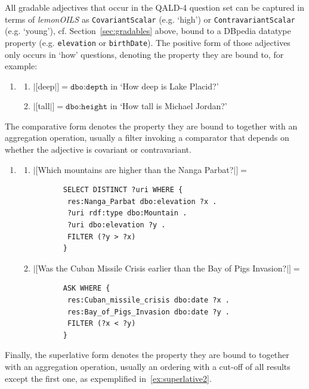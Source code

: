 \documentclass[11pt]{article}
\begin{document}
All gradable adjectives that occur in the QALD-4 question set can be captured in terms of \emph{lemonOILS} 
as \texttt{CovariantScalar} (e.g. `high') or \texttt{ContravariantScalar} (e.g. `young'), cf. Section~\ref{sec:gradables} above, 
bound to a DBpedia datatype property (e.g. \texttt{elevation} or \texttt{birthDate}). 
The positive form of those adjectives only occurs in `how' questions, denoting the property they are bound to, for example:
\begin{enumerate}[resume] 
\item \begin{enumerate}
 \item $|[$deep$|]=\texttt{dbo:depth}$ in `How deep is Lake Placid?'
 \item $|[$tall$|]=\texttt{dbo:height}$ in `How tall is Michael Jordan?'
 \end{enumerate}
\end{enumerate}
The comparative form denotes the property they are bound to together with an aggregation operation, usually a filter 
invoking a comparator that depends on whether the adjective is covariant or contravariant.
\begin{enumerate}[resume]
\item \begin{enumerate}
 \item $|[$Which mountains are higher than the Nanga Parbat?$|]=$
       \begin{verbatim}
       SELECT DISTINCT ?uri WHERE { 
        res:Nanga_Parbat dbo:elevation ?x .
        ?uri rdf:type dbo:Mountain .
        ?uri dbo:elevation ?y . 
        FILTER (?y > ?x) 
       }
       \end{verbatim} 
 \item $|[$Was the Cuban Missile Crisis earlier than the Bay of Pigs Invasion?$|]=$ 
       \begin{verbatim}
       ASK WHERE {
        res:Cuban_missile_crisis dbo:date ?x . 
        res:Bay_of_Pigs_Invasion dbo:date ?y . 
        FILTER (?x < ?y) 
       }
       \end{verbatim}
\end{enumerate}
\end{enumerate}
Finally, the superlative form denotes the property they are bound to together with an aggregation operation, 
usually an ordering with a cut-off of all results except the first one, as expemplified in~\ref{ex:superlative2}. 
\end{document}
